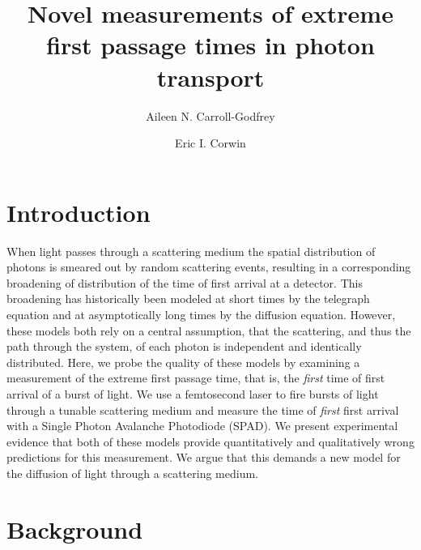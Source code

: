 \documentclass[9pt,twocolumn,twoside]{opticajnl}
\title{Novel measurements of extreme first passage times in photon transport}
\author[1,*]{Aileen N. Carroll-Godfrey}
\author[1]{Eric I. Corwin}
\affil[1]{UO affiliation here, Optica Publishing Group, 2010 Massachusetts Avenue NW, Washington DC, 20036}
\affil[*]{email@my-email.com}
\begin{document}
\maketitle

\section{Introduction}
When light passes through a scattering medium the spatial distribution of photons is smeared out by random scattering events, resulting in a corresponding broadening of distribution of the time of first arrival at a detector.  This broadening has historically been modeled at short times by the telegraph equation and at asymptotically long times by the diffusion equation.  However, these models both rely on a central assumption, that the scattering, and thus the path through the system, of each photon is independent and identically distributed.  Here, we probe the quality of these models by examining a measurement of the extreme first passage time, that is, the \textit{first} time of first arrival of a burst of light.  We use a femtosecond laser to fire bursts of light through a tunable scattering medium and measure the time of \textit{first} first arrival with a Single Photon Avalanche Photodiode (SPAD).  We present experimental evidence that both of these models provide quantitatively and qualitatively wrong predictions for this measurement.  We argue that this demands a new model for the diffusion of light through a scattering medium.

\section{Background}
\end{document}
